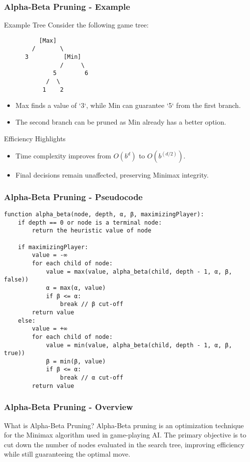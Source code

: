 \documentclass[aspectratio=169]{beamer}
\begin{document}
\begin{frame}[fragile]
    \frametitle{Alpha-Beta Pruning - Example}
    \begin{block}{Example Tree}
    Consider the following game tree:
    \begin{verbatim}
          [Max]
        /       \
      3          [Min]
                /     \
              5        6
            /  \
           1    2
    \end{verbatim}
    \end{block}
    \begin{itemize}
        \item Max finds a value of `3`, while Min can guarantee `5` from the first branch.
        \item The second branch can be pruned as Min already has a better option.
    \end{itemize}
    \begin{block}{Efficiency Highlights}
        \begin{itemize}
            \item Time complexity improves from \( O(b^d) \) to \( O(b^{(d/2)}) \).
            \item Final decisions remain unaffected, preserving Minimax integrity.
        \end{itemize}
    \end{block}
\end{frame}

\begin{frame}[fragile]
    \frametitle{Alpha-Beta Pruning - Pseudocode}
    \begin{lstlisting}
function alpha_beta(node, depth, α, β, maximizingPlayer):
    if depth == 0 or node is a terminal node:
        return the heuristic value of node
        
    if maximizingPlayer:
        value = -∞
        for each child of node:
            value = max(value, alpha_beta(child, depth - 1, α, β, false))
            α = max(α, value)
            if β <= α:
                break // β cut-off
        return value
    else:
        value = +∞
        for each child of node:
            value = min(value, alpha_beta(child, depth - 1, α, β, true))
            β = min(β, value)
            if β <= α:
                break // α cut-off
        return value
    \end{lstlisting}
\end{frame}

\begin{frame}[fragile]
    \frametitle{Alpha-Beta Pruning - Overview}
    \begin{block}{What is Alpha-Beta Pruning?}
        Alpha-Beta pruning is an optimization technique for the Minimax algorithm used in game-playing AI. The primary objective is to cut down the number of nodes evaluated in the search tree, improving efficiency while still guaranteeing the optimal move.
    \end{block}
\end{frame}
\end{document}
